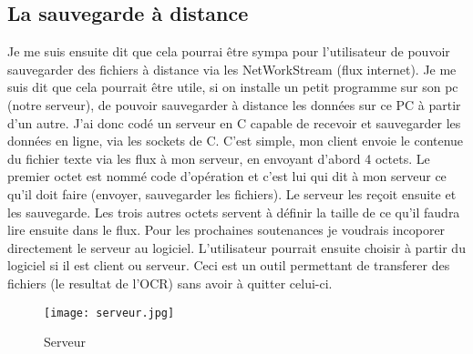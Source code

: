 \documentclass{article}
\begin{document}
                \subsection{La sauvegarde à distance}
Je me suis ensuite dit que cela pourrai être sympa pour l’utilisateur de pouvoir sauvegarder des fichiers à distance via les NetWorkStream (flux internet). Je me suis dit que cela pourrait être utile, si on installe un petit programme sur son pc (notre serveur), de pouvoir sauvegarder à distance les données sur ce PC à partir d’un autre. J’ai donc codé un serveur en C capable de recevoir et sauvegarder les données en ligne, via les sockets de C. C’est simple, mon client envoie le contenue du fichier texte via les flux à mon serveur, en envoyant d’abord 4 octets. Le premier octet est nommé code d’opération et c’est lui qui dit à mon serveur ce qu’il doit faire (envoyer, sauvegarder les fichiers). Le serveur les reçoit ensuite et les sauvegarde. Les trois autres octets servent à définir la taille de ce qu’il faudra lire ensuite dans le flux. Pour les prochaines soutenances je voudrais incoporer directement le serveur au logiciel. L’utilisateur pourrait ensuite choisir à partir du logiciel si il est client ou serveur. Ceci est un outil permettant de transferer des fichiers (le resultat de l’OCR) sans avoir à quitter celui-ci.
\\
    \begin{figure}[hp]
	    \centering
	    \texttt{[image: serveur.jpg]}
	    \caption{Serveur }
    \end{figure}
\\
\end{document}
